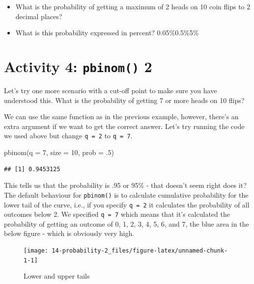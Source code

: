 \documentclass[
  oneside]{book}
\newenvironment{Shaded}{\begin{snugshade}}{\end{snugshade}}
\newcommand{\AttributeTok}[1]{\textcolor[rgb]{0.77,0.63,0.00}{#1}}
\newcommand{\DecValTok}[1]{\textcolor[rgb]{0.00,0.00,0.81}{#1}}
\newcommand{\FunctionTok}[1]{\textcolor[rgb]{0.00,0.00,0.00}{#1}}
\newcommand{\NormalTok}[1]{#1}
\providecommand{\tightlist}{%
  \setlength{\itemsep}{0pt}\setlength{\parskip}{0pt}}
\begin{document}
\begin{itemize}
\tightlist
\item
  What is the probability of getting a maximum of 2 heads on 10 coin flips to 2 decimal places? \\
\item
  What is this probability expressed in percent? 0.05\%0.5\%5\%
\end{itemize}

\hypertarget{activity-4-pbinom-2}{%
\section{\texorpdfstring{Activity 4: \texttt{pbinom()} 2}{Activity 4: pbinom() 2}}\label{activity-4-pbinom-2}}

Let's try one more scenario with a cut-off point to make sure you have understood this. What is the probability of getting 7 or more heads on 10 flips?

We can use the same function as in the previous example, however, there's an extra argument if we want to get the correct answer. Let's try running the code we used above but change \texttt{q\ =\ 2} to \texttt{q\ =\ 7}.

\begin{Shaded}
\begin{Highlighting}[]
\FunctionTok{pbinom}\NormalTok{(}\AttributeTok{q =} \DecValTok{7}\NormalTok{, }\AttributeTok{size =} \DecValTok{10}\NormalTok{, }\AttributeTok{prob =}\NormalTok{ .}\DecValTok{5}\NormalTok{) }
\end{Highlighting}
\end{Shaded}

\begin{verbatim}
## [1] 0.9453125
\end{verbatim}

This tells us that the probability is .95 or 95\% - that doesn't seem right does it? The default behaviour for \texttt{pbinom()} is to calculate cumulative probability for the lower tail of the curve, i.e., if you specify \texttt{q\ =\ 2} it calculates the probability of all outcomes below 2. We specified \texttt{q\ =\ 7} which means that it's calculated the probability of getting an outcome of 0, 1, 2, 3, 4, 5, 6, and 7, the blue area in the below figure - which is obviously very high.

\begin{figure}

{\centering \texttt{[image: 14-probability-2\_files/figure-latex/unnamed-chunk-1-1]} 

}

\caption{Lower and upper tails}\label{fig:unnamed-chunk-1}
\end{figure}
\end{document}
